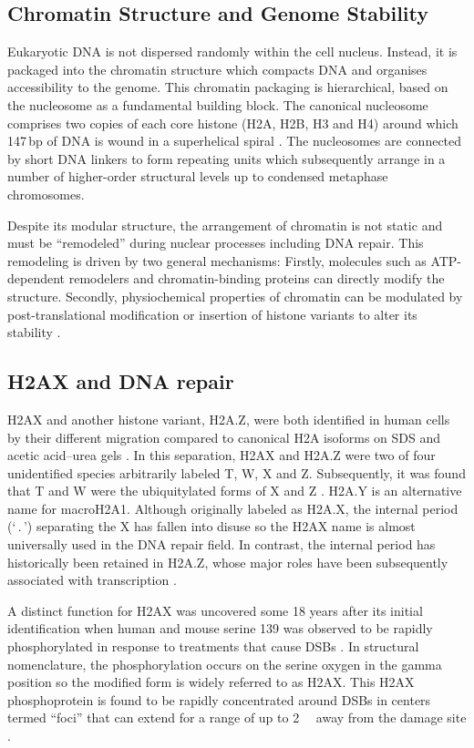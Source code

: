 \subsection{Chromatin Structure and Genome Stability}
Eukaryotic DNA is not dispersed randomly within the cell nucleus. Instead, it is packaged into the
chromatin structure which compacts DNA and organises accessibility to the genome. This chromatin
packaging is hierarchical, based on the nucleosome as a fundamental building block. The canonical
nucleosome comprises two copies of each core histone (H2A, H2B, H3 and H4) around which 147\,bp of
DNA is wound in a superhelical spiral \citep{CAD+02}. The nucleosomes are connected by short DNA
linkers to form repeating units which subsequently arrange in a number of higher-order structural
levels up to condensed metaphase chromosomes.

Despite its modular structure, the arrangement of chromatin is not static and must be ``remodeled''
during nuclear processes including DNA repair. This remodeling is driven by two general mechanisms:
Firstly, molecules such as ATP-dependent remodelers and chromatin-binding proteins can directly
modify the structure. Secondly, physiochemical properties of chromatin can be modulated by
post-translational modification or insertion of histone variants to alter its stability \citep{GFMG03,JA06}.

\subsection{H2AX and DNA repair}
H2AX and another histone variant, H2A.Z, were both identified in human cells by their different
migration compared to canonical H2A isoforms on SDS and acetic acid--urea gels \citep{MHPW80}. In
this separation, H2AX and H2A.Z were two of four unidentified species arbitrarily labeled T, W, X
and Z\@. Subsequently, it was found that T and W were the ubiquitylated forms of X and Z \citep{MHPW80}.
H2A.Y is an alternative name for macroH2A1. Although originally labeled as H2A.X, the internal
period (`\,.\,') separating the X has fallen into disuse so the H2AX name is almost universally used
in the DNA repair field. In contrast, the internal period has historically been retained in H2A.Z,
whose major roles have been subsequently associated with transcription \citep{JA06}.

A distinct function for H2AX was uncovered some 18 years after its initial identification when human
and mouse serine 139 was observed to be rapidly phosphorylated in response to treatments that cause
DSBs \citep{EPR+98}. In structural nomenclature, the phosphorylation occurs on the serine oxygen in
the gamma position so the modified form is widely referred to as \textgamma H2AX\@. This \textgamma H2AX
phosphoprotein is found to be rapidly concentrated around DSBs in centers termed ``foci'' that can
extend for a range of up to \SI{2}{\mega\bp} away from the damage site \citep{EPR+99}.

